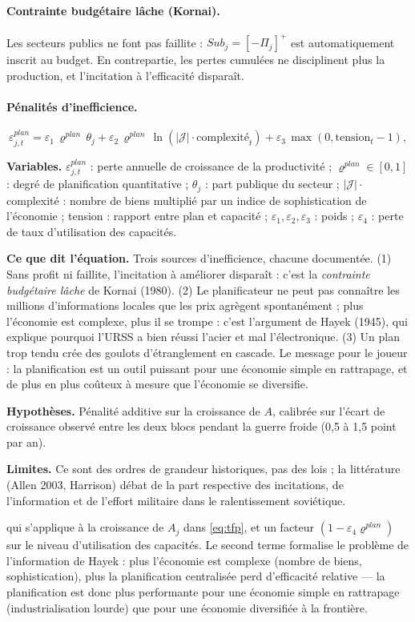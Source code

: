 \documentclass[11pt,a4paper]{article}
\newcommand{\variables}{\par\noindent\textbf{Variables.} }
\newcommand{\sens}{\par\noindent\textbf{Ce que dit l'équation.} }
\newcommand{\hyp}{\par\noindent\textbf{Hypothèses.} }
\newcommand{\limites}{\par\noindent\textbf{Limites.} }
\newcommand{\pos}[1]{{\left[#1\right]^{+}}}
\begin{document}
\paragraph{Contrainte budgétaire lâche (Kornai).} Les secteurs publics ne font pas faillite : $Sub_j = \pos{-\Pi_j}$ est automatiquement inscrit au budget. En contrepartie, les pertes cumulées ne disciplinent plus la production, et l'incitation à l'efficacité disparaît.

\paragraph{Pénalités d'inefficience.} 
\begin{equation}
\varepsilon^{plan}_{j,t} = \varepsilon_1\, \varrho^{plan}\,\theta_j + \varepsilon_2\, \varrho^{plan}\, \ln(|\mathcal{J}|\cdot \text{complexité}_t) + \varepsilon_3\, \max(0, \text{tension}_t - 1),
\end{equation}
\begin{lecture}
\variables $\varepsilon^{plan}_{j,t}$ : perte annuelle de croissance de la productivité ; $\varrho^{plan}\in[0,1]$ : degré de planification quantitative ; $\theta_j$ : part publique du secteur ; $|\mathcal{J}|\cdot$complexité : nombre de biens multiplié par un indice de sophistication de l'économie ; tension : rapport entre plan et capacité ; $\varepsilon_1,\varepsilon_2,\varepsilon_3$ : poids ; $\varepsilon_4$ : perte de taux d'utilisation des capacités.
\sens Trois sources d'inefficience, chacune documentée. (1) Sans profit ni faillite, l'incitation à améliorer disparaît : c'est la \emph{contrainte budgétaire lâche} de Kornai (1980). (2) Le planificateur ne peut pas connaître les millions d'informations locales que les prix agrègent spontanément ; plus l'économie est complexe, plus il se trompe : c'est l'argument de Hayek (1945), qui explique pourquoi l'URSS a bien réussi l'acier et mal l'électronique. (3) Un plan trop tendu crée des goulots d'étranglement en cascade. Le message pour le joueur : la planification est un outil puissant pour une économie simple en rattrapage, et de plus en plus coûteux à mesure que l'économie se diversifie.
\hyp Pénalité additive sur la croissance de $A$, calibrée sur l'écart de croissance observé entre les deux blocs pendant la guerre froide (0,5 à 1,5 point par an).
\limites Ce sont des ordres de grandeur historiques, pas des lois ; la littérature (Allen 2003, Harrison) débat de la part respective des incitations, de l'information et de l'effort militaire dans le ralentissement soviétique.
\end{lecture}
qui s'applique à la croissance de $A_j$ dans \eqref{eq:tfp}, et un facteur $(1 - \varepsilon_4 \varrho^{plan})$ sur le niveau d'utilisation des capacités. Le second terme formalise le problème de l'information de Hayek : plus l'économie est complexe (nombre de biens, sophistication), plus la planification centralisée perd d'efficacité relative --- la planification est donc plus performante pour une économie simple en rattrapage (industrialisation lourde) que pour une économie diversifiée à la frontière.
\end{document}
